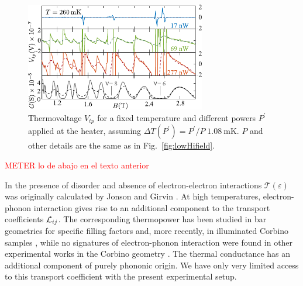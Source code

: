 \begin{figure}
    \includegraphics[width=0.7\textwidth]{figures/vtpGmodel/termovoltageConductance/fig3.pdf}
    \caption{Thermovoltage $V_{tp}$  for a fixed temperature and different powers $P^{\prime}$
    applied at the heater, assuming $\Delta T (P^{\prime}) = P^{\prime}/P \; \SI{1.08}{\milli\kelvin}$.
    $P$ and other details are the same as in  Fig.~\ref{fig:lowHifield}.}
    \label{fig:modelHeaterPower}
\end{figure}




\textcolor{red}{METER lo de abajo en el texto anterior}

In the presence of disorder and absence of electron-electron interactions ${\mathcal T}(\varepsilon)$ was originally calculated by Jonson and Girvin \cite{jonson1984thermoelectric}. At high temperatures, electron-phonon interaction gives rise to an additional component to the transport coefficients ${\cal L}_{ij}$. The corresponding thermopower has been studied  in bar geometries for specific filling factors \cite{tieke1996even,zhang2004oscillatory} and, more recently, in illuminated Corbino samples \cite{Zalinge2003}, while no signatures of electron-phonon interaction were found in other experimental works in the Corbino geometry \cite{kobayakawa2013diffusion}.
The thermal conductance has an additional component of purely phononic origin. We have only very limited access to this transport coefficient with the present experimental setup.
